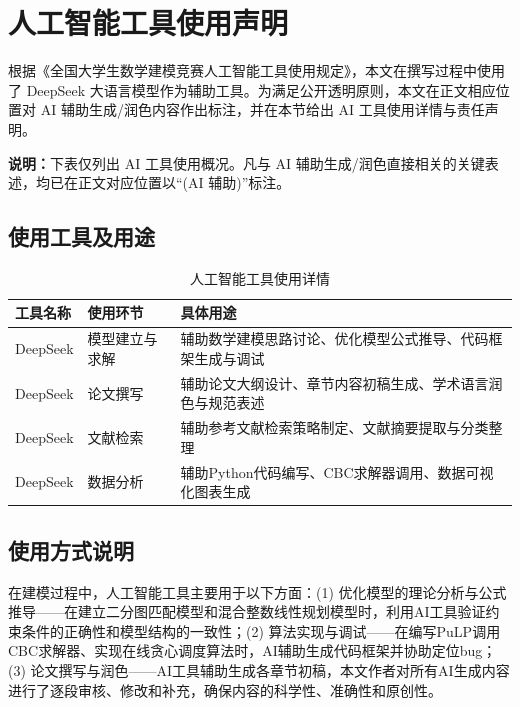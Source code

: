 \documentclass[12pt,a4paper]{ctexart}
\begin{document}

\section{人工智能工具使用声明}

根据《全国大学生数学建模竞赛人工智能工具使用规定》，本文在撰写过程中使用了 DeepSeek 大语言模型作为辅助工具。为满足公开透明原则，本文在正文相应位置对 AI 辅助生成/润色内容作出标注，并在本节给出 AI 工具使用详情与责任声明。

\textbf{说明：}下表仅列出 AI 工具使用概况。凡与 AI 辅助生成/润色直接相关的关键表述，均已在正文对应位置以``(AI 辅助)''标注。

\subsection{使用工具及用途}

\begin{table}[H]
  \centering
  \caption{人工智能工具使用详情}
  \label{tab:ai}
  \begin{tabular}{p{3cm}|p{3cm}|p{5cm}}
    \toprule
    工具名称 & 使用环节 & 具体用途 \\
    \midrule
    DeepSeek & 模型建立与求解 & 辅助数学建模思路讨论、优化模型公式推导、代码框架生成与调试 \\
    \hline
    DeepSeek & 论文撰写 & 辅助论文大纲设计、章节内容初稿生成、学术语言润色与规范表述 \\
    \hline
    DeepSeek & 文献检索 & 辅助参考文献检索策略制定、文献摘要提取与分类整理 \\
    \hline
    DeepSeek & 数据分析 & 辅助Python代码编写、CBC求解器调用、数据可视化图表生成 \\
    \bottomrule
  \end{tabular}
\end{table}

\subsection{使用方式说明}

在建模过程中，人工智能工具主要用于以下方面：(1) 优化模型的理论分析与公式推导——在建立二分图匹配模型和混合整数线性规划模型时，利用AI工具验证约束条件的正确性和模型结构的一致性；(2) 算法实现与调试——在编写PuLP调用CBC求解器、实现在线贪心调度算法时，AI辅助生成代码框架并协助定位bug；(3) 论文撰写与润色——AI工具辅助生成各章节初稿，本文作者对所有AI生成内容进行了逐段审核、修改和补充，确保内容的科学性、准确性和原创性。
\end{document}
